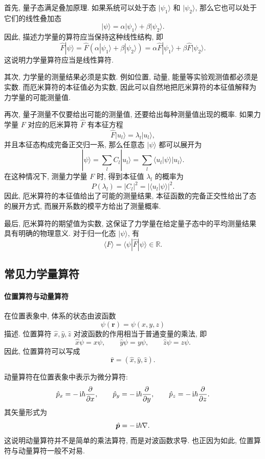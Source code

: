 首先, 量子态满足叠加原理. 如果系统可以处于态 $|\psi_1\rangle$ 和 $|\psi_2\rangle$, 那么它也可以处于它们的线性叠加态
\[
|\psi\rangle=\alpha|\psi_1\rangle+\beta|\psi_2\rangle .
\]
因此, 描述力学量的算符应当保持这种线性结构, 即
\[
\hat F|\psi\rangle
=
\hat F(\alpha|\psi_1\rangle+\beta|\psi_2\rangle)
=
\alpha\hat F|\psi_1\rangle+\beta\hat F|\psi_2\rangle .
\]
这说明力学量算符应当是线性算符.

其次, 力学量的测量结果必须是实数. 例如位置, 动量, 能量等实验观测值都必须是实数. 而厄米算符的本征值必为实数, 因此可以自然地把厄米算符的本征值解释为力学量的可能测量值.

再次, 量子测量不仅要给出可能的测量值, 还要给出每种测量值出现的概率. 如果力学量 $F$ 对应的厄米算符 $\hat F$ 有本征方程
\[
\hat F|u_l\rangle=\lambda_l|u_l\rangle,
\]
并且本征态构成完备正交归一系, 那么任意态 $|\psi\rangle$ 都可以展开为
\[
|\psi\rangle=\sum_l C_l|u_l\rangle
=
\sum_l \langle u_l|\psi\rangle |u_l\rangle .
\]
在这种情况下, 测量力学量 $F$ 时, 得到本征值 $\lambda_l$ 的概率为
\[
P(\lambda_l)=|C_l|^2
=
|\langle u_l|\psi\rangle|^2.
\]
因此, 厄米算符的本征值给出了可能的测量结果, 本征函数的完备正交性给出了态的展开方式, 而展开系数的模平方给出了测量概率.

最后, 厄米算符的期望值为实数, 这保证了力学量在给定量子态中的平均测量结果具有明确的物理意义. 对于归一化态 $|\psi\rangle$, 有
\[
\langle F\rangle
=
\langle \psi|\hat F|\psi\rangle
\in \mathbb{R}.
\]

\subsection{常见力学量算符}
\label{sec:common_operators}
\paragraph{位置算符与动量算符}

在位置表象中, 体系的状态由波函数
\[
\psi(\bm r)=\psi(x, y, z)
\]
描述. 位置算符 $\hat x, \hat y, \hat z$ 对波函数的作用相当于普通变量的乘法, 即
\[
\hat x\psi=x\psi, \qquad
\hat y\psi=y\psi, \qquad
\hat z\psi=z\psi.
\]
因此, 位置算符可以写成
\[
\hat{\bm r}=(\hat x, \hat y, \hat z).
\]

动量算符在位置表象中表示为微分算符:
\[
\hat p_x=-\mathop{}\!\mathrm{i}\hbar\frac{\partial}{\partial x}, \qquad
\hat p_y=-\mathop{}\!\mathrm{i}\hbar\frac{\partial}{\partial y}, \qquad
\hat p_z=-\mathop{}\!\mathrm{i}\hbar\frac{\partial}{\partial z}.
\]
其矢量形式为
\[
\hat{\bm p}=-\mathop{}\!\mathrm{i}\hbar\nabla.
\]
这说明动量算符并不是简单的乘法算符, 而是对波函数求导. 也正因为如此, 位置算符与动量算符一般不对易.

